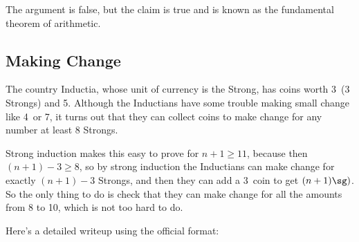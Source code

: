 The argument is false, but the claim is true and is known as the
fundamental theorem of arithmetic.
\fi

\subsection{Making Change}

The country Inductia, whose unit of currency is the Strong, has coins
worth 3\sg\ (3 Strongs) and 5\sg.  Although the Inductians have some
trouble making small change like 4\sg\ or 7\sg, it turns out that they can
collect coins to make change for any number at least 8 Strongs.

Strong induction makes this easy to prove for $n+1 \ge 11$, because then
$(n+1)-3 \ge 8$, so by strong induction the Inductians can make change for
exactly $(n+1)-3$ Strongs, and then they can add a 3\sg\ coin to get
$(n+1)\sg)$.  So the only thing to do is check that they can make change
for all the amounts from 8 to 10\sg, which is not too hard to do.

Here's a detailed writeup using the official format:

